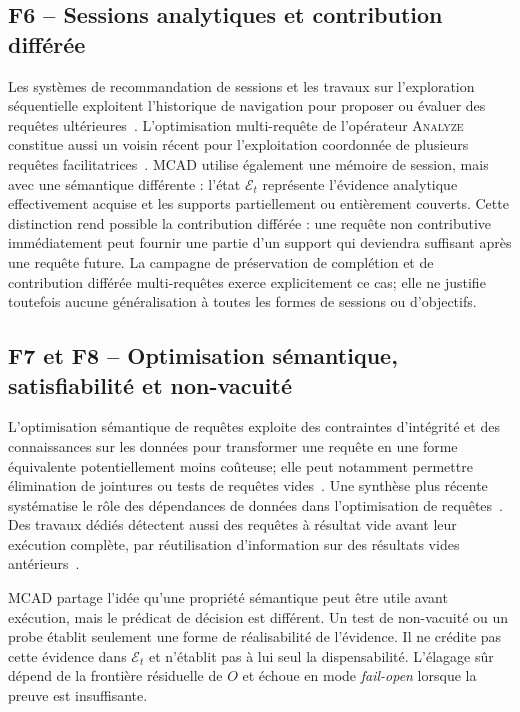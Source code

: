 \documentclass[journal]{IEEEtran}
\begin{document}
\subsection{F6 -- Sessions analytiques et contribution différée}

Les systèmes de recommandation de sessions et les travaux sur l'exploration séquentielle exploitent l'historique de navigation pour proposer ou évaluer des requêtes ultérieures~\cite{AligonDSS2015,DjedainiEtAl2019}. L'optimisation multi-requête de l'opérateur \textsc{Analyze} constitue aussi un voisin récent pour l'exploitation coordonnée de plusieurs requêtes facilitatrices~\cite{IakovidisVassiliadis2026}. MCAD utilise également une mémoire de session, mais avec une sémantique différente : l'état $\mathcal{E}_t$ représente l'évidence analytique effectivement acquise et les supports partiellement ou entièrement couverts. Cette distinction rend possible la contribution différée : une requête non contributive immédiatement peut fournir une partie d'un support qui deviendra suffisant après une requête future. La campagne de préservation de complétion et de contribution différée multi-requêtes exerce explicitement ce cas; elle ne justifie toutefois aucune généralisation à toutes les formes de sessions ou d'objectifs.

\subsection{F7 et F8 -- Optimisation sémantique, satisfiabilité et non-vacuité}

L'optimisation sémantique de requêtes exploite des contraintes d'intégrité et des connaissances sur les données pour transformer une requête en une forme équivalente potentiellement moins coûteuse; elle peut notamment permettre élimination de jointures ou tests de requêtes vides~\cite{BertinoMusto1992}. Une synthèse plus récente systématise le rôle des dépendances de données dans l'optimisation de requêtes~\cite{KossmannPapenbrockNaumann2022}. Des travaux dédiés détectent aussi des requêtes à résultat vide avant leur exécution complète, par réutilisation d'information sur des résultats vides antérieurs~\cite{LuoEmptyResult2006}.

MCAD partage l'idée qu'une propriété sémantique peut être utile avant exécution, mais le prédicat de décision est différent. Un test de non-vacuité ou un probe établit seulement une forme de réalisabilité de l'évidence. Il ne crédite pas cette évidence dans $\mathcal{E}_t$ et n'établit pas à lui seul la dispensabilité. L'élagage sûr dépend de la frontière résiduelle de $O$ et échoue en mode \emph{fail-open} lorsque la preuve est insuffisante.
\end{document}
